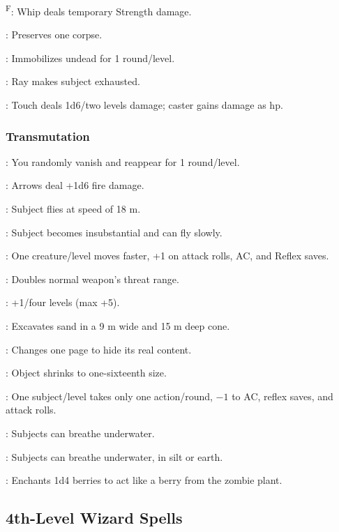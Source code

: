 	\textsuperscript{F}: Whip deals temporary Strength damage. %

	: Preserves one corpse.

	: Immobilizes undead for 1 round/level.

	: Ray makes subject exhausted.

	: Touch deals 1d6/two levels damage; caster gains damage as hp.

\subsubsection{Transmutation}
	: You randomly vanish and reappear for 1 round/level.

	: Arrows deal +1d6 fire damage.

	: Subject flies at speed of 18 m.

	: Subject becomes insubstantial and can fly slowly.

	: One creature/level moves faster, +1 on attack rolls, AC, and Reflex saves.

	: Doubles normal weapon's threat range.

	: +1/four levels (max +5).

	: Excavates sand in a 9 m wide and 15 m deep cone. %

	: Changes one page to hide its real content.

	: Object shrinks to one-sixteenth size.

	: One subject/level takes only one action/round, $-1$ to AC, reflex saves, and attack rolls.

	: Subjects can breathe underwater.

	: Subjects can breathe underwater, in silt or earth. %

	: Enchants 1d4 berries to act like a berry from the zombie plant. %



\subsection{4th-Level Wizard Spells}

